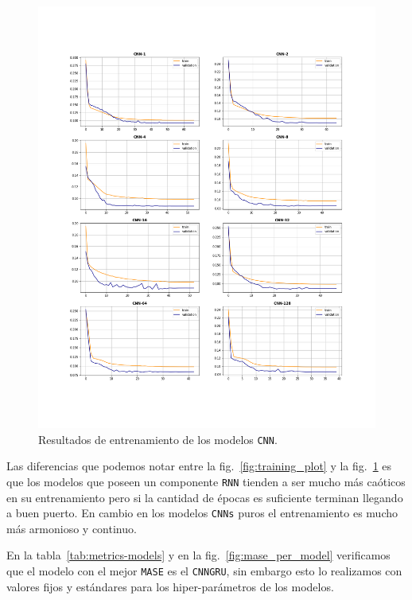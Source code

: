 \documentclass[a4paper,12pt]{article}
\begin{document}
\begin{figure}[H]
	\begin{center}
	\includegraphics[width=1\textwidth]{train_cnn.png}
  	\caption{Resultados de entrenamiento de los modelos \texttt{CNN}.}
  	\label{fig:train_cnn}
  	\end{center}
\end{figure}

Las diferencias que podemos notar entre la fig.~\ref{fig:training_plot} y la fig.~\ref{fig:train_cnn} es que los modelos que poseen un componente \texttt{RNN} tienden a ser mucho más caóticos en su entrenamiento pero si la cantidad de épocas es suficiente terminan llegando a buen puerto. En cambio en los modelos \texttt{CNNs} puros el entrenamiento es mucho más armonioso y continuo.

En la tabla~\ref{tab:metrics-models} y en la fig.~\ref{fig:mase_per_model} verificamos que el modelo con el mejor \texttt{MASE} es el \texttt{CNNGRU}, sin embargo esto lo realizamos con valores fijos y estándares para los hiper-parámetros de los modelos.
\end{document}
